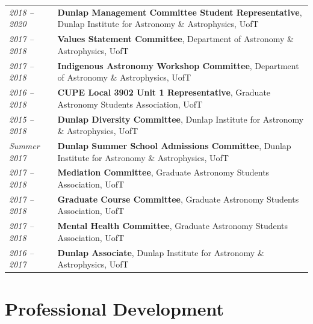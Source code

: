 \documentclass[10pt]{res} %
\begin{document}
\begin{resume}
\begin{table}[h]
\begin{tabularx}{\textwidth}{lX}
\textit{2018 -- 2020} & \textbf{Dunlap Management Committee Student Representative}, Dunlap Institute for Astronomy \& Astrophysics, UofT \\
\textit{2017 -- 2018} & \textbf{Values Statement Committee}, Department of Astronomy \& Astrophysics, UofT \\
\textit{2017 -- 2018} & \textbf{Indigenous Astronomy  Workshop Committee}, Department of Astronomy \& Astrophysics, UofT \\
\textit{2016 --  2018} & \textbf{CUPE Local 3902 Unit 1 Representative}, Graduate Astronomy Students Association, UofT \\
\textit{2015 --  2018} & \textbf{Dunlap Diversity Committee}, Dunlap Institute for Astronomy \& Astrophysics, UofT \\
\textit{Summer 2017} & \textbf{Dunlap Summer School Admissions Committee}, Dunlap Institute for Astronomy \& Astrophysics, UofT \\
\textit{2017 -- 2018} & \textbf{Mediation Committee}, Graduate Astronomy Students Association, UofT \\
\textit{2017 -- 2018} & \textbf{Graduate Course Committee}, Graduate Astronomy Students Association, UofT \\
\textit{2017 -- 2018} & \textbf{Mental Health Committee}, Graduate Astronomy Students Association, UofT \\
\textit{2016 --  2017} & \textbf{Dunlap Associate}, Dunlap Institute for Astronomy \& Astrophysics, UofT
\end{tabularx}
\end{table}


\section{\Large Professional Development}
\vspace{-5pt} %
\noindent\makebox[\linewidth]{\rule{\textwidth}{0.4pt}}
\vspace{-20pt} %


\end{resume}
\end{document}
